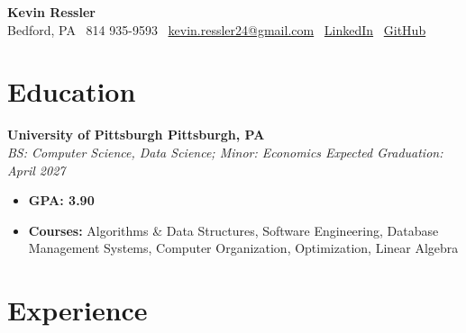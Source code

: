 \documentclass[11pt]{article}
\begin{document}
\begin{center}
  {\Huge \textbf{Kevin Ressler}}\\ [2pt]
  Bedford, PA \textbar\ 814 935-9593 \textbar\ \href{mailto:kevin.ressler24@gmail.com}{kevin.ressler24@gmail.com} \textbar\ \href{https://www.linkedin.com/in/kevin-ressler-09604929b}{LinkedIn} \textbar\ \href{https://https://github.com/kevinressler}{GitHub}
\end{center}

\section*{Education}
\vspace{0.1em}
\begin{adjustwidth}{0.5em}{0em}
\textbf{University of Pittsburgh \hfill Pittsburgh, PA} \\
\textit{BS: Computer Science, Data Science; Minor: Economics \hfill Expected Graduation: April 2027}
\begin{itemize}[leftmargin=1.5em, itemsep=0em, topsep=0.2em]
    \item \textbf{GPA: 3.90}
    \item \textbf{Courses:} Algorithms \& Data Structures, Software Engineering, Database Management Systems, Computer Organization, Optimization, Linear Algebra
\end{itemize}
\end{adjustwidth}



\section*{Experience}
\vspace{0.1em}
\end{document}
